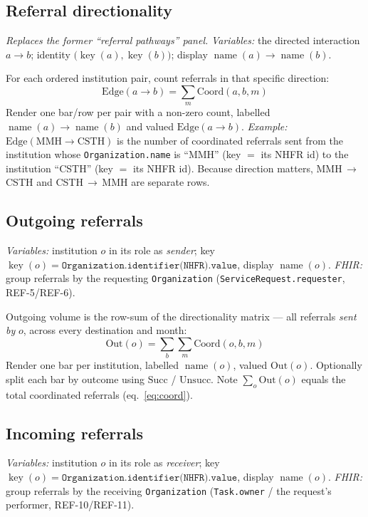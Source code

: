 \documentclass[11pt]{article}
\newcommand{\Coord}{\mathrm{Coord}}
\newcommand{\Succ}{\mathrm{Succ}}
\newcommand{\Unsucc}{\mathrm{Unsucc}}
\newcommand{\key}{\operatorname{key}}
\newcommand{\name}{\operatorname{name}}
\newcommand{\fhir}[1]{\texttt{#1}}
\begin{document}
\subsection{Referral directionality}\label{sec:edges}
\textit{Replaces the former ``referral pathways'' panel.} \textit{Variables:} the directed interaction $a\!\to\! b$; identity $\bigl(\key(a),\key(b)\bigr)$; display $\name(a)\!\to\!\name(b)$.

For each ordered institution pair, count referrals in that specific direction:
\begin{equation}
\mathrm{Edge}(a\!\to\! b) = \sum_{m} \Coord(a,b,m) \label{eq:edge}
\end{equation}
Render one bar/row per pair with a non-zero count, labelled $\name(a)\!\to\!\name(b)$ and valued $\mathrm{Edge}(a\!\to\! b)$. \emph{Example:} $\mathrm{Edge}(\text{MMH}\!\to\!\text{CSTH})$ is the number of coordinated referrals sent from the institution whose \fhir{Organization.name} is ``MMH'' (key $=$ its NHFR id) to the institution ``CSTH'' (key $=$ its NHFR id). Because direction matters, MMH\,$\to$\,CSTH and CSTH\,$\to$\,MMH are separate rows.

\subsection{Outgoing referrals}\label{sec:outgoing}
\textit{Variables:} institution $o$ in its role as \emph{sender}; key $\key(o)=\fhir{Organization.identifier(NHFR).value}$, display $\name(o)$. \textit{FHIR:} group referrals by the requesting \fhir{Organization} (\fhir{ServiceRequest.requester}, REF-5/REF-6).

Outgoing volume is the row-sum of the directionality matrix --- all referrals \emph{sent by} $o$, across every destination and month:
\begin{equation}
\mathrm{Out}(o) = \sum_{b}\sum_{m} \Coord(o,b,m) \label{eq:out}
\end{equation}
Render one bar per institution, labelled $\name(o)$, valued $\mathrm{Out}(o)$. Optionally split each bar by outcome using $\Succ$ / $\Unsucc$. Note $\sum_{o}\mathrm{Out}(o)$ equals the total coordinated referrals (eq.~\ref{eq:coord}).

\subsection{Incoming referrals}\label{sec:incoming}
\textit{Variables:} institution $o$ in its role as \emph{receiver}; key $\key(o)=\fhir{Organization.identifier(NHFR).value}$, display $\name(o)$. \textit{FHIR:} group referrals by the receiving \fhir{Organization} (\fhir{Task.owner} / the request's performer, REF-10/REF-11).
\end{document}
